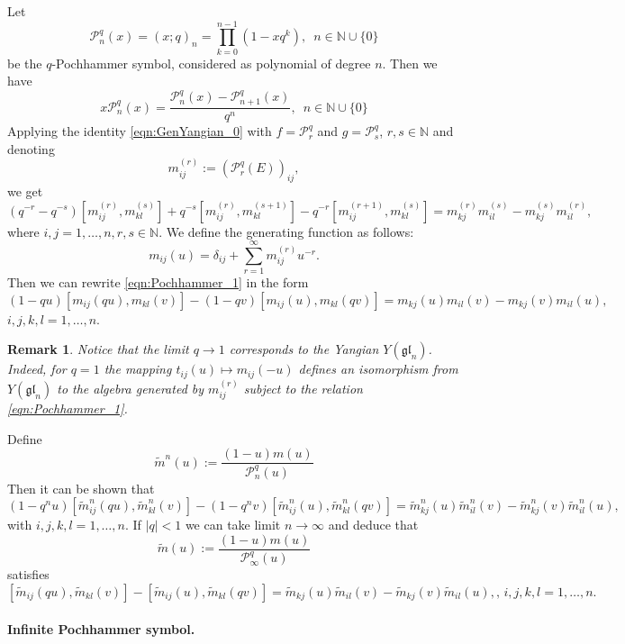 \documentclass[10pt]{article}%
\numberwithin{equation}{section}
\newtheorem{rem}[thm]{Remark}
\newcommand{\gl}{{\mathfrak{gl}}}
\begin{document}
Let
\[
\mathcal{P}_n^{q}(x)=(x;q)_n=\prod\limits_{k=0}^{n-1}(1-x q^k),\,\,\,  n\in\mathbb{N}\cup\{0\}
\]
be the $q$-Pochhammer symbol, considered as polynomial of degree $n$. Then we have
\[
x\mathcal{P}_n^{q}(x)=\frac{\mathcal{P}_n^{q}(x)-\mathcal{P}_{n+1}^{q}(x)}{q^n},\,\,\, n\in\mathbb{N}\cup\{0\}
\]
Applying the identity \eqref{eqn:GenYangian_0} with $f=\mathcal{P}_r^{q}$ and $g=\mathcal{P}_s^{q}$, $r,s\in \mathbb{N}$ and denoting
\[
m_{ij}^{(r)}:=(\mathcal{P}_r^{q}(E))_{ij},
\]
we get
\begin{equation}\label{eqn:Pochhammer_1}
(q^{-r}-q^{-s})[m^{(r)}_{ij},m^{(s)}_{kl}]+q^{-s}[m^{(r)}_{ij},m^{(s+1)}_{kl}]-q^{-r}[m^{(r+1)}_{ij},m^{(s)}_{kl}]=m^{(r)}_{kj}m^{(s)}_{il}-m^{(s)}_{kj}m^{(r)}_{il},
\end{equation}
where $i,j=1,\ldots,n,r,s\in \mathbb{N}$. We define the generating function as follows:
\[
m_{ij}(u)=\delta_{ij}+\sum\limits_{r=1}^{\infty}m^{(r)}_{ij} u^{-r}.
\]
Then we can rewrite \eqref{eqn:Pochhammer_1} in the form
\begin{equation}\label{eqn:Pochhammer_2}
(1-qu)[m_{ij}(qu),m_{kl}(v)]-(1-qv)[m_{ij}(u),m_{kl}(qv)]=m_{kj}(u)m_{il}(v)-m_{kj}(v)m_{il}(u),
\end{equation}
$i,j,k,l=1,\ldots,n$.
\begin{rem}
Notice that the limit $q\to 1$ corresponds to the Yangian $Y(\gl_n)$.
 Indeed, 
 for $q=1$ the mapping 
$t_{ij}(u)\mapsto m_{ij}(-u)$ defines an isomorphism from 
$Y(\gl_n) $ to the algebra generated by $m_{ij}^{(r)}$ subject to the relation 
\eqref{eqn:Pochhammer_1}.
\end{rem}
Define 
\[
\tilde{m}^n(u):=\frac{(1-u)m(u)}{\mathcal{P}_n^{q}(u)}
\]
Then it can be shown that
\begin{equation}\label{eqn:Pochhammer_3}
(1-q^n u)[\tilde{m}^n_{ij}(qu),\tilde{m}^n_{kl}(v)]-(1-q^n v)[\tilde{m}^n_{ij}(u),\tilde{m}^n_{kl}(qv)]=\tilde{m}^n_{kj}(u)\tilde{m}^n_{il}(v)-\tilde{m}^n_{kj}(v)\tilde{m}^n_{il}(u), 
\end{equation}
with $i,j,k,l=1,\ldots,n$. 
If $|q|<1$ we can take limit $n\to \infty$ and deduce that
\[
\tilde{m}(u):=\frac{(1-u)m(u)}{\mathcal{P}_{\infty}^{q}(u)}
\]
satisfies
\begin{equation}\label{eqn:Pochhammer_4}
[\tilde{m}_{ij}(qu),\tilde{m}_{kl}(v)]-[\tilde{m}_{ij}(u),\tilde{m}_{kl}(qv)]=\tilde{m}_{kj}(u)\tilde{m}_{il}(v)-\tilde{m}_{kj}(v)\tilde{m}_{il}(u), ,\, i,j,k,l=1,\ldots,n.
\end{equation}
\paragraph{Infinite Pochhammer symbol.}
\end{document}
